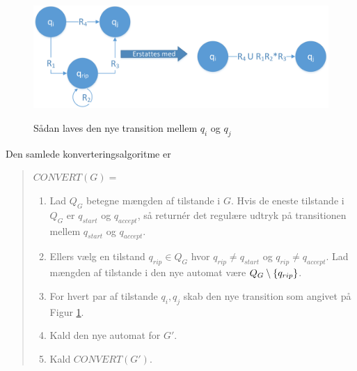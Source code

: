 \documentclass[a4paper,10pt,article]{memoir}
\begin{document}
\begin{bevis}
\begin{figure}[H]%
{\centering 
\includegraphics[width=\textwidth]{Fig19x.png}
} \caption{Sådan laves den nye transition mellem $q_i$ og $q_j$}
\label{fig:fig19}
\end{figure}

Den samlede konverteringsalgoritme er

\begin{quote}
\noindent $\textit{CONVERT}(G) = $
\begin{enumerate}
\item Lad $Q_G$ betegne mængden af tilstande i $G$. Hvis de eneste
  tilstande i $Q_G$ er $q_{start}$ og $q_{accept}$, så returnér det
  regulære udtryk på transitionen mellem $q_{start}$ og $q_{accept}$.
\item Ellers vælg en tilstand $q_{rip} \in Q_G$ hvor $q_{rip} \neq q_{start}$
  og $q_{rip} \neq q_{accept}$. Lad mængden af tilstande i den nye automat være
  $Q_G \setminus \{ q_{rip} \}$.
\item For hvert par af tilstande $q_i,q_j$ skab den nye transition som
  angivet på Figur \ref{fig:fig19}.
\item Kald den nye automat for $G'$.
\item Kald $\textit{CONVERT}(G')$.
\end{enumerate}
\end{quote}
\end{bevis}
\end{document}
